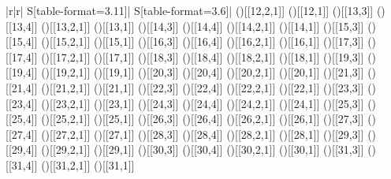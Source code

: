 \begin{table}
{\begin{minipage}{1.0\linewidth}
\begin{tabular}{|r|r|
S[table-format=3.11]|
S[table-format=3.6]|
}
{()[[12,2,1]]}
{()[[12,1]]}
\aLine
{()[[13,3]]}
{()[[13,4]]}
{()[[13,2,1]]}
{()[[13,1]]}
\aLine
{()[[14,3]]}
{()[[14,4]]}
{()[[14,2,1]]}
{()[[14,1]]}
\aLine
{()[[15,3]]}
{()[[15,4]]}
{()[[15,2,1]]}
{()[[15,1]]}
\aLine
{()[[16,3]]}
{()[[16,4]]}
{()[[16,2,1]]}
{()[[16,1]]}
\aLine
{()[[17,3]]}
{()[[17,4]]}
{()[[17,2,1]]}
{()[[17,1]]}
\aLine
{()[[18,3]]}
{()[[18,4]]}
{()[[18,2,1]]}
{()[[18,1]]}
\aLine
{()[[19,3]]}
{()[[19,4]]}
{()[[19,2,1]]}
{()[[19,1]]}
\aLine
{()[[20,3]]}
{()[[20,4]]}
{()[[20,2,1]]}
{()[[20,1]]}
\aLine
{()[[21,3]]}
{()[[21,4]]}
{()[[21,2,1]]}
{()[[21,1]]}
\aLine
{()[[22,3]]}
{()[[22,4]]}
{()[[22,2,1]]}
{()[[22,1]]}
\aLine
{()[[23,3]]}
{()[[23,4]]}
{()[[23,2,1]]}
{()[[23,1]]}
\aLine
{()[[24,3]]}
{()[[24,4]]}
{()[[24,2,1]]}
{()[[24,1]]}
\aLine
{()[[25,3]]}
{()[[25,4]]}
{()[[25,2,1]]}
{()[[25,1]]}
\aLine
{()[[26,3]]}
{()[[26,4]]}
{()[[26,2,1]]}
{()[[26,1]]}
\aLine
{()[[27,3]]}
{()[[27,4]]}
{()[[27,2,1]]}
{()[[27,1]]}
\aLine
{()[[28,3]]}
{()[[28,4]]}
{()[[28,2,1]]}
{()[[28,1]]}
\aLine
{()[[29,3]]}
{()[[29,4]]}
{()[[29,2,1]]}
{()[[29,1]]}
\aLine
{()[[30,3]]}
{()[[30,4]]}
{()[[30,2,1]]}
{()[[30,1]]}
\aLine
{()[[31,3]]}
{()[[31,4]]}
{()[[31,2,1]]}
{()[[31,1]]}

\end{tabular}
\end{minipage}}
\end{table}
